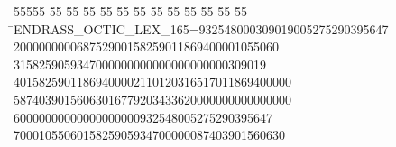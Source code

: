 %
%
\begin{tabbing}
55555 \= 55 \= 55 \= 55 \= 55 \= 55 \= 55 \= 55 \= 55 \= 55 \= 55 \= 55 \= 55 \= \>ENDRASS\_OCTIC\_LEX\_165=932548000309019005275290395647\\[0pt]
200000000068752900158259011869400001055060\\[0pt]
3\>158259059347000000000000000000000309019\\[0pt]
40158259011869400002110120316517011869400000\\[0pt]
58740390156063016779203433620000000000000000\\[0pt]
60000000000000000000932548005275290395647\\[0pt]
7000105506015825905934700000087403901560630\\[0pt]

\end{tabbing}

